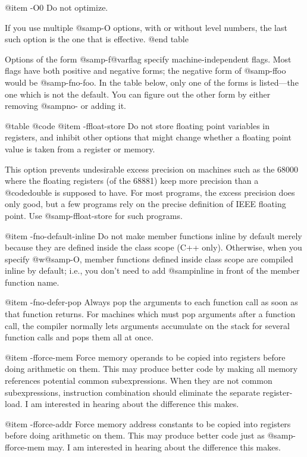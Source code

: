 {@item -O0
Do not optimize.

If you use multiple @samp{-O} options, with or without level numbers,
the last such option is the one that is effective.
@end table

Options of the form @samp{-f@var{flag}} specify machine-independent
flags.  Most flags have both positive and negative forms; the negative
form of @samp{-ffoo} would be @samp{-fno-foo}.  In the table below,
only one of the forms is listed---the one which is not the default.
You can figure out the other form by either removing @samp{no-} or
adding it.

@table @code
@item -ffloat-store
Do not store floating point variables in registers, and inhibit other
options that might change whether a floating point value is taken from a
register or memory.

This option prevents undesirable excess precision on machines such as
the 68000 where the floating registers (of the 68881) keep more
precision than a @code{double} is supposed to have.  For most programs,
the excess precision does only good, but a few programs rely on the
precise definition of IEEE floating point.  Use @samp{-ffloat-store} for
such programs.

@item -fno-default-inline
Do not make member functions inline by default merely because they are
defined inside the class scope (C++ only).  Otherwise, when you specify
@w{@samp{-O}}, member functions defined inside class scope are compiled
inline by default; i.e., you don't need to add @samp{inline} in front of
the member function name.

@item -fno-defer-pop
Always pop the arguments to each function call as soon as that function
returns.  For machines which must pop arguments after a function call,
the compiler normally lets arguments accumulate on the stack for several
function calls and pops them all at once.

@item -fforce-mem
Force memory operands to be copied into registers before doing
arithmetic on them.  This may produce better code by making all
memory references potential common subexpressions.  When they are
not common subexpressions, instruction combination should
eliminate the separate register-load.  I am interested in hearing
about the difference this makes.

@item -fforce-addr
Force memory address constants to be copied into registers before
doing arithmetic on them.  This may produce better code just as
@samp{-fforce-mem} may.  I am interested in hearing about the
difference this makes.

}
